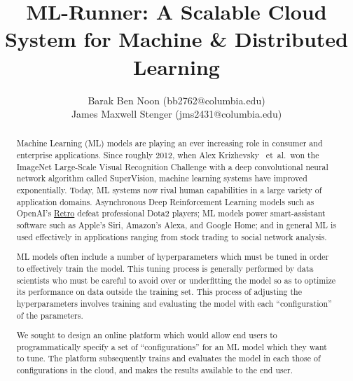 \documentclass[12pt,oneside]{amsart}
\title{ML-Runner: A Scalable Cloud System for Machine \& Distributed Learning} %
\author{
    Barak Ben Noon (bb2762@columbia.edu) \\
    James Maxwell Stenger (jms2431@columbia.edu)
}
\newcommand{\etal}{\mbox{ et al. }}
\begin{document}
\pagecolor{pagecolor}

\begin{abstract}
Machine Learning (ML) models are playing an ever increasing role in consumer and enterprise applications.
Since roughly 2012, when Alex Krizhevsky \etal won the ImageNet Large-Scale Visual Recognition Challenge with a deep convolutional neural network algorithm called SuperVision,
machine learning systems have improved exponentially.
Today, ML systems now rival human capabilities in a large variety of application domains.
Asynchronous Deep Reinforcement Learning models such as OpenAI's \href{https://github.com/openai/retro}{Retro} defeat professional Dota2 players;
ML models power smart-assistant software such as Apple's Siri, Amazon's Alexa, and Google Home;
and in general ML is used effectively in applications ranging from stock trading to social network analysis.

ML models often include a number of hyperparameters which must be tuned in order to effectively train the model.
This tuning process is generally performed by data scientists who must be careful to avoid over or underfitting the model so as to optimize its performance on data outside the training set.
This process of adjusting the hyperparameters involves training and evaluating the model with each ``configuration'' of the parameters.

We sought to design an online platform which would allow end users to programmatically specify a set of ``configurations'' for an ML model which they want to tune.
The platform subsequently trains and evaluates the model in each those of configurations in the cloud, and makes the results available to the end user.
\end{abstract}
\end{document}
